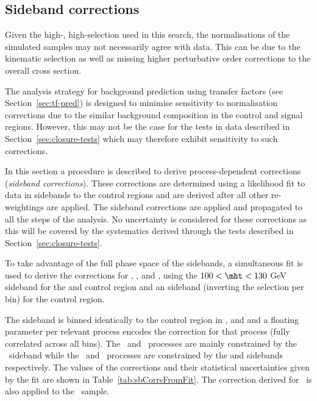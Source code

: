 \subsection{Sideband corrections}
\label{sec:sideband-corrections}

Given the high-\scalht, high-\etmiss selection used in this search, 
the normalisations of the simulated samples may not necessarily agree with data. 
This can be due to the kinematic selection as well as missing higher 
perturbative order corrections to the overall cross section. 

The analysis strategy for background prediction
using transfer factors (see Section~\ref{sec:tf-pred}) is designed to minimise sensitivity 
to normalisation corrections due to the similar background composition
in the control and signal regions. However, this may not be the case for 
the tests in data described in Section~\ref{sec:closure-tests} which
may therefore exhibit sensitivity to such corrections.

In this section a procedure is described to derive process-dependent corrections (\emph{sideband corrections}).
These corrections are determined using a likelihood fit to data in sidebands to the control regions
and are derived after all other re-weightings are applied. The sideband corrections are applied and propagated 
to all the steps of the analysis. No uncertainty is considered for these corrections as
this will be covered by the systematics derived through the tests described in Section~\ref{sec:closure-tests}.

To take advantage of the full phase space of the sidebands, a simultaneous 
fit is used to derive the corrections for \gj, \wj, \zj and \ttbar, using the $100<\mht<130$ GeV sideband
for the \mj and \mmj control region and an \alphat sideband (inverting the \alphat selection per \scalht bin)
for the \gj control region. 

The sideband is binned identically to the control region in \njet, \nb and \scalht and a floating 
parameter per relevant process encodes the correction for that process (fully correlated across all bins).
The \wj~and \ttbar~processes are mainly constrained by the \mj~sideband while the \zj~and \gj~processes are
constrained by the \mmj and \gj sidebands respectively. The values of the corrections and their statistical uncertainties
given by the fit are shown in Table~\ref{tab:sbCorrsFromFit}. The correction derived for \zj~is
also applied to the \znunu~sample. 

